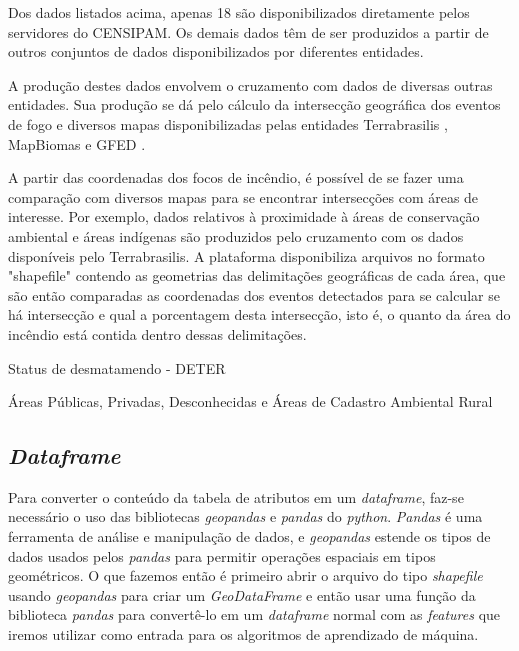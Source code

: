 Dos dados listados acima, apenas 18 são disponibilizados diretamente pelos servidores do CENSIPAM. Os demais dados têm de ser produzidos a partir de outros conjuntos de dados disponibilizados por diferentes entidades. 

A produção destes dados envolvem o cruzamento com dados de diversas outras entidades. Sua produção se dá pelo cálculo da intersecção geográfica dos eventos de fogo e diversos mapas disponibilizadas pelas entidades Terrabrasilis \cite{terrabrasilis}, MapBiomas \cite{MapBiomasQueimadas} e GFED \cite{gfed}. 

A partir das coordenadas dos focos de incêndio, é possível de se fazer uma comparação com diversos mapas para se encontrar intersecções com áreas de interesse. Por exemplo, dados relativos à proximidade à áreas de conservação ambiental e áreas indígenas são produzidos pelo cruzamento com os dados disponíveis pelo Terrabrasilis. A plataforma disponibiliza arquivos no formato "shapefile" contendo as geometrias das delimitações geográficas de cada área, que são então comparadas as coordenadas dos eventos detectados para se calcular se há intersecção e qual a porcentagem desta intersecção, isto é, o quanto da área do incêndio está contida dentro dessas delimitações.

Status de desmatamendo - DETER

Áreas Públicas, Privadas, Desconhecidas e Áreas de Cadastro Ambiental Rural



\subsection{\textit{Dataframe}}

Para converter o conteúdo da tabela de atributos em um \textit{dataframe}, faz-se necessário o uso das bibliotecas \textit{geopandas} e \textit{pandas} do \textit{python}. \textit{Pandas} é uma ferramenta de análise e manipulação de dados, e \textit{geopandas} estende os tipos de dados usados pelos \textit{pandas} para permitir operações espaciais em tipos geométricos. O que fazemos então é primeiro abrir o arquivo do tipo \textit{shapefile} usando \textit{geopandas} para criar um \textit{GeoDataFrame} e então usar uma função da biblioteca \textit{pandas} para convertê-lo em um \textit{dataframe} normal com as \textit{features} que iremos utilizar como entrada para os algoritmos de aprendizado de máquina.

